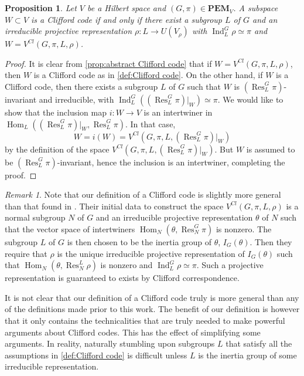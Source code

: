 \documentclass[11pt, oneside, reqno]{amsart}
\newcommand{\PEM}{\mathbf{PEM}}
\newcommand{\Hom}{\operatorname{Hom}}
\newcommand{\Res}{\operatorname{Res}}
\newcommand{\Ind}{\operatorname{Ind}}
\theoremstyle{definition}
\theoremstyle{plain}
\newtheorem{proposition}[definition]{Proposition}
\theoremstyle{remark}
\newtheorem{remark}[definition]{Remark}
\begin{document}
\begin{proposition}\label{prop:abstract Clifford code is Clifford code}
    Let $V$ be a Hilbert space and $(G,\pi) \in \PEM_V$. A subspace $W \subset V$ is a Clifford code if and only if there exist a subgroup $L$ of $G$ and an irreducible projective representation $\rho \colon L \to U(V_\rho)$ with $\Ind_L^G\rho \simeq \pi$ and $W = V^{Cl}(G,\pi,L,\rho)$. 
\end{proposition}
\begin{proof}
    It is clear from \cref{prop:abstract Clifford code} that if $W = V^{Cl}(G,\pi,L,\rho)$, then $W$ is a Clifford code as in \cref{def:Clifford code}. On the other hand, if $W$ is a Clifford code, then there exists a subgroup $L$ of $G$ such that $W$ is $(\Res^G_L\pi)$-invariant and irreducible, with $\Ind^G_L((\Res^G_L\pi)|_W) \simeq \pi$. We would like to show that the inclusion map $i \colon W \to V$ is an intertwiner in $\Hom_L((\Res^G_L\pi)|_W,\Res^G_L\pi)$. In that case,
    \begin{equation*}
        W = i(W) = V^{Cl}(G,\pi,L,(\Res^G_L\pi)|_W)
    \end{equation*}
    by the definition of the space $V^{Cl}(G,\pi,L,(\Res^G_L\pi)|_W)$. But $W$ is assumed to be $(\Res^G_L\pi)$-invariant, hence the inclusion is an intertwiner, completing the proof.
\end{proof}

\begin{remark}\label{rem:more general notion of Clifford code}
    Note that our definition of a Clifford code is slightly more general than that found in \cite{KnillI96, KlappeneckerRöttelerI02, KlappeneckerRöttelerII02}. Their initial data to construct the space $V^{Cl}(G,\pi,L,\rho)$ is a normal subgroup $N$ of $G$ and an irreducible projective representation $\theta$ of $N$ such that the vector space of intertwiners $\Hom_N(\theta, \Res^G_N\pi)$ is nonzero. The subgroup $L$ of $G$ is then chosen to be the inertia group of $\theta$, $I_G(\theta)$. Then they require that $\rho$ is the unique irreducible projective representation of $I_G(\theta)$ such that $\Hom_N(\theta, \Res^L_N\rho)$ is nonzero and $\Ind^G_L\rho \simeq \pi$. Such a projective representation is guaranteed to exists by Clifford correspondence.

    It is not clear that our definition of a Clifford code truly is more general than any of the definitions made prior to this work. The benefit of our definition is however that it only contains the technicalities that are truly needed to make powerful arguments about Clifford codes. This has the effect of simplifying some arguments. In reality, naturally stumbling upon subgroups $L$ that satisfy all the assumptions in \cref{def:Clifford code} is difficult unless $L$ is the inertia group of some irreducible representation.
\end{remark}
\end{document}
